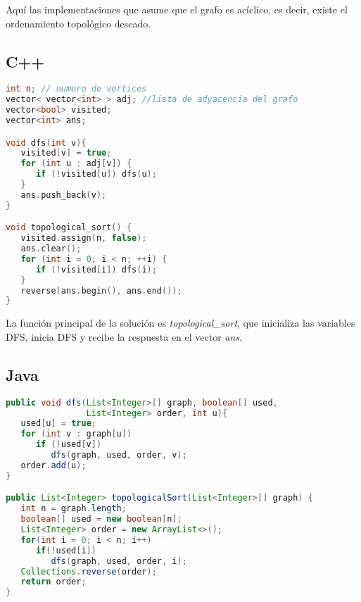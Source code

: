 Aquí las  implementaciones que asume que el grafo es acíclico, es decir, existe el ordenamiento topológico deseado. 

\subsection{C++}
\begin{lstlisting}[language=C++]
int n; // numero de vertices
vector< vector<int> > adj; //lista de adyacencia del grafo
vector<bool> visited;
vector<int> ans;

void dfs(int v){
   visited[v] = true;
   for (int u : adj[v]) {
      if (!visited[u]) dfs(u);
   }
   ans.push_back(v);
}

void topological_sort() {
   visited.assign(n, false);
   ans.clear();
   for (int i = 0; i < n; ++i) {
      if (!visited[i]) dfs(i);
   }
   reverse(ans.begin(), ans.end());
}
\end{lstlisting}

La función principal de la solución es \emph{topological\_sort}, que inicializa las variables DFS, inicia DFS y recibe la respuesta en el vector \emph{ans}.

\subsection{Java}
\begin{lstlisting}[language=Java]
public void dfs(List<Integer>[] graph, boolean[] used,
                List<Integer> order, int u){
   used[u] = true;
   for (int v : graph[u])
      if (!used[v])
         dfs(graph, used, order, v);
   order.add(u);
}

public List<Integer> topologicalSort(List<Integer>[] graph) {
   int n = graph.length;
   boolean[] used = new boolean[n];
   List<Integer> order = new ArrayList<>();
   for(int i = 0; i < n; i++)
      if(!used[i])
         dfs(graph, used, order, i);
   Collections.reverse(order);
   return order;
}
\end{lstlisting}